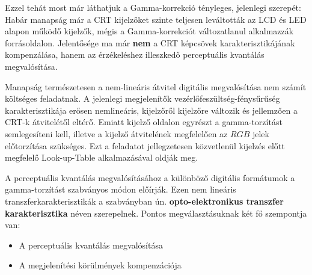 Ezzel tehát most már láthatjuk a Gamma-korrekció tényleges, jelenlegi szerepét:
Habár manapság már a CRT kijelzőket szinte teljesen leváltották az LCD és LED alapon működő kijelzők, mégis a Gamma-korrekciót változatlanul alkalmazzák forrásoldalon.
Jelentősége ma már \textbf{nem} a CRT képcsövek karakterisztikájának kompenzálása, hanem az érzékeléshez illeszkedő perceptuális kvantálás megvalósítása.

\vspace{3mm}
Manapság természetesen a nem-lineáris átvitel digitális megvalósítása nem számít költséges feladatnak.
A jelenlegi megjelenítők vezérlőfeszültség-fénysűrűség karakterisztikája erősen nemlineáris, kijelzőről kijelzőre változik és jellemzően a CRT-k átvitelétől eltérő.
Emiatt kijelző oldalon egyrészt a gamma-torzítást semlegesíteni kell, illetve a kijelző átvitelének megfelelően az $RGB$ jelek előtorzítása szükséges.
Ezt a feladatot jellegzetesen közvetlenül kijelzés előtt megfelelő Look-up-Table alkalmazásával oldják meg.

\vspace{3mm}
A perceptuális kvantálás megvalósításához a különböző digitális formátumok a gamma-torzítást szabványos módon előírják.
Ezen nem lineáris transzferkarakterisztikák a szabványban ún. \textbf{opto-elektronikus transzfer karakterisztika} néven szerepelnek.
Pontos megválasztásuknak két fő szempontja van:
\begin{itemize}
\item A perceptuális kvantálás megvalósítása
\item A megjelenítési körülmények kompenzációja
\end{itemize}

